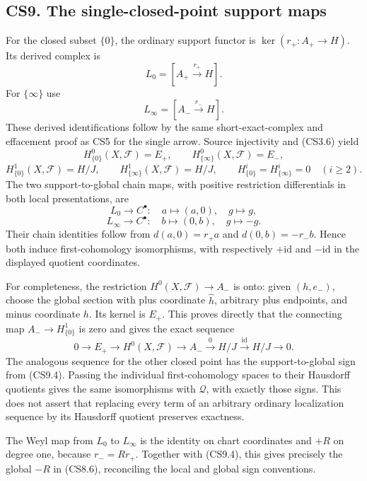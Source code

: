 \subsection{CS9. The single-closed-point support
maps}\label{cs9.-the-single-closed-point-support-maps}

For the closed subset \(\{0\}\), the ordinary support functor is
\(\ker(r_+:A_+\to H)\). Its derived complex is \[
L_0=[A_+\xrightarrow{\,r_+\,}H].
\tag{CS9.1}
\] For \(\{\infty\}\) use \[
L_\infty=[A_-\xrightarrow{\,r_-\,}H].
\tag{CS9.2}
\] These derived identifications follow by the same short-exact-complex
and effacement proof as CS5 for the single arrow. Source injectivity and
(CS3.6) yield \[
H^0_{\{0\}}(X,\mathscr F)=E_+,\qquad
H^0_{\{\infty\}}(X,\mathscr F)=E_-,
\] \[
H^1_{\{0\}}(X,\mathscr F)=H/J,\qquad
H^1_{\{\infty\}}(X,\mathscr F)=H/J,
\qquad H^i_{\{0\}}=H^i_{\{\infty\}}=0\quad(i\ge2).
\tag{CS9.3}
\] The two support-to-global chain maps, with positive restriction
differentials in both local presentations, are \[
L_0\longrightarrow C^\bullet:
\quad a\longmapsto(a,0),\quad g\longmapsto g,
\] \[
L_\infty\longrightarrow C^\bullet:
\quad b\longmapsto(0,b),\quad g\longmapsto-g.
\tag{CS9.4}
\] Their chain identities follow from \(d(a,0)=r_+a\) and
\(d(0,b)=-r_-b\). Hence both induce first-cohomology isomorphisms, with
respectively \(+\mathrm{id}\) and \(-\mathrm{id}\) in the displayed
quotient coordinates.

For completeness, the restriction \(H^0(X,\mathscr F)\to A_-\) is onto:
given \((h,e_-)\), choose the global section with plus coordinate
\(\widehat h\), arbitrary plus endpoints, and minus coordinate \(h\).
Its kernel is \(E_+\). This proves directly that the connecting map
\(A_-\to H^1_{\{0\}}\) is zero and gives the exact sequence \[
0\longrightarrow E_+
\longrightarrow H^0(X,\mathscr F)
\longrightarrow A_-
\xrightarrow{\,0\,}H/J
\xrightarrow{\,\mathrm{id}\,}H/J
\longrightarrow0.
\tag{CS9.5}
\] The analogous sequence for the other closed point has the
support-to-global sign from (CS9.4). Passing the individual
first-cohomology spaces to their Hausdorff quotients gives the same
isomorphisms with \(\mathcal Q\), with exactly those signs. This does
not assert that replacing every term of an arbitrary ordinary
localization sequence by its Hausdorff quotient preserves exactness.

The Weyl map from \(L_0\) to \(L_\infty\) is the identity on chart
coordinates and \(+R\) on degree one, because \(r_-=Rr_+\). Together
with (CS9.4), this gives precisely the global \(-R\) in (CS8.6),
reconciling the local and global sign conventions.


